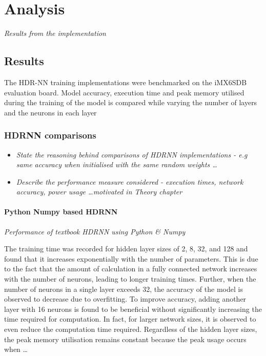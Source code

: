 \part{Analysis}
\textit{Results from the implementation}

\chapter{Results}

The HDR-NN training implementations were benchmarked on the iMX6SDB evaluation board. Model accuracy, execution time and peak memory utilised during the training of the model is compared while varying the number of layers and the neurons in each layer

\section{HDRNN comparisons}
\begin{itemize}
	\item \textit{State the reasoning behind comparisons of HDRNN implementations - e.g same accuracy when initialised with the same random weights \dots}
	\item \textit{Describe the performance measure considered - execution times, network accuracy, power usage \dots motivated in Theory chapter}

\end{itemize}

\subsection[Python - Numpy]{Python Numpy based HDRNN}
\textit{Performance of textbook HDRNN using Python \& Numpy}

The training time was recorded for hidden layer sizes of 2, 8, 32, and 128 and 
found that it increases exponentially with the number of parameters. This is due to 
the fact that the amount of calculation in a fully connected network increases with the 
number of neurons, leading to longer training times. 
Further, when the number of 
neurons in a single layer exceeds 32, the accuracy of the model is observed to decrease 
due to overfitting. To improve accuracy, adding another layer with 16 neurons is found to 
be beneficial without significantly increasing the time required for computation. 
In fact, for larger network sizes, it is observed to even reduce the computation time required. 
Regardless of the hidden layer sizes, the peak memory utilisation remains constant because the 
peak usage occurs when \dots  


